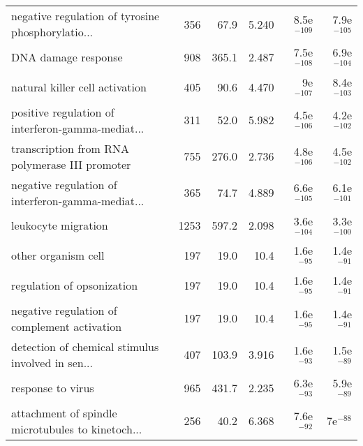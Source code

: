 \begin{longtable}{lrrrrr}
 negative regulation of tyrosine phosphorylatio... &                     356 &                    67.9 &      5.240 &        8.5e$^{-109}$ &        7.9e$^{-105}$ \\
                               DNA damage response &                     908 &                   365.1 &      2.487 &        7.5e$^{-108}$ &        6.9e$^{-104}$ \\
                    natural killer cell activation &                     405 &                    90.6 &      4.470 &          9e$^{-107}$ &        8.4e$^{-103}$ \\
 positive regulation of interferon-gamma-mediat... &                     311 &                    52.0 &      5.982 &        4.5e$^{-106}$ &        4.2e$^{-102}$ \\
    transcription from RNA polymerase III promoter &                     755 &                   276.0 &      2.736 &        4.8e$^{-106}$ &        4.5e$^{-102}$ \\
 negative regulation of interferon-gamma-mediat... &                     365 &                    74.7 &      4.889 &        6.6e$^{-105}$ &        6.1e$^{-101}$ \\
                               leukocyte migration &                    1253 &                   597.2 &      2.098 &        3.6e$^{-104}$ &        3.3e$^{-100}$ \\
                               other organism cell &                     197 &                    19.0 &       10.4 &         1.6e$^{-95}$ &         1.4e$^{-91}$ \\
                        regulation of opsonization &                     197 &                    19.0 &       10.4 &         1.6e$^{-95}$ &         1.4e$^{-91}$ \\
      negative regulation of complement activation &                     197 &                    19.0 &       10.4 &         1.6e$^{-95}$ &         1.4e$^{-91}$ \\
 detection of chemical stimulus involved in sen... &                     407 &                   103.9 &      3.916 &         1.6e$^{-93}$ &         1.5e$^{-89}$ \\
                                 response to virus &                     965 &                   431.7 &      2.235 &         6.3e$^{-93}$ &         5.9e$^{-89}$ \\
 attachment of spindle microtubules to kinetoch... &                     256 &                    40.2 &      6.368 &         7.6e$^{-92}$ &           7e$^{-88}$ \\

\end{longtable}

